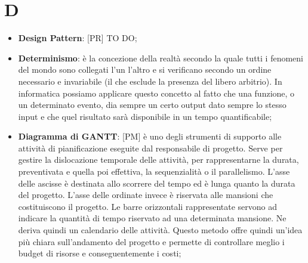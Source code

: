 % 
%
%

\section{D}

\begin{itemize}
	\item \textbf{Design Pattern}: [PR] TO DO;
	\item \textbf{Determinismo}: è la concezione della realtà secondo la quale tutti i fenomeni del mondo sono collegati l’un l’altro e si verificano secondo un ordine necessario e invariabile (il che esclude la presenza del libero arbitrio). \newline
In informatica possiamo applicare questo concetto al fatto che una funzione, o un determinato evento, dia sempre un certo output dato sempre lo stesso input e che quel risultato sarà disponibile in un tempo quantificabile;

	\item \textbf {Diagramma di GANTT}: [PM] è uno degli strumenti di supporto alle attività di pianificazione eseguite dal responsabile di progetto. \newline
Serve per gestire la dislocazione temporale delle attività, per rappresentarne la durata, preventivata e quella poi effettiva, la sequenzialità o il parallelismo. \newline
L'asse delle ascisse è destinata allo scorrere del tempo ed è lunga quanto la durata del progetto. \newline
L'asse delle ordinate invece è riservata alle mansioni che costituiscono il progetto. \newline
Le barre orizzontali rappresentate servono ad indicare la quantità di tempo riservato ad una determinata mansione. Ne deriva quindi un calendario delle attività. \newline
Questo metodo offre quindi un'idea più chiara sull'andamento del progetto e permette di controllare meglio i budget di risorse e conseguentemente i costi;


\end{itemize}

